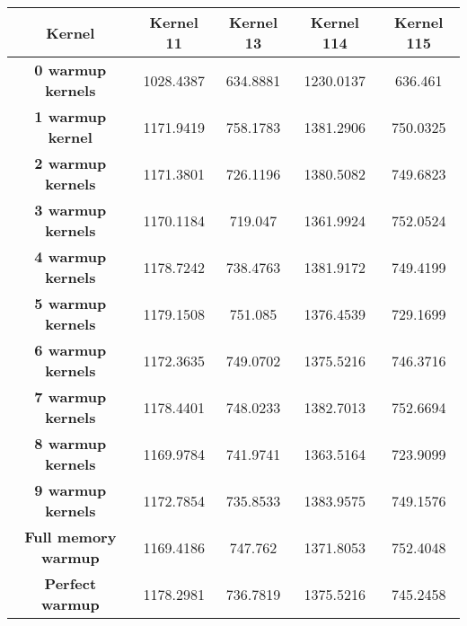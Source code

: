 \begin{tabular}{ |c|c|c|c|c |}
    \hline
    \textbf{Kernel} & Kernel 11 & Kernel 13 & Kernel 114 & Kernel 115 \\
    \hline
    \hline
    \textbf{0 warmup kernels} & 1028.4387 & 634.8881 & 1230.0137 & 636.461 \\
    \textbf{1 warmup kernel} & 1171.9419 & 758.1783 & 1381.2906 & 750.0325 \\
    \textbf{2 warmup kernels} & 1171.3801 & 726.1196 & 1380.5082 & 749.6823 \\
    \textbf{3 warmup kernels} & 1170.1184 & 719.047 & 1361.9924 & 752.0524 \\
    \textbf{4 warmup kernels} & 1178.7242 & 738.4763 & 1381.9172 & 749.4199 \\
    \textbf{5 warmup kernels} & 1179.1508 & 751.085 & 1376.4539 & 729.1699 \\
    \textbf{6 warmup kernels} & 1172.3635 & 749.0702 & 1375.5216 & 746.3716 \\
    \textbf{7 warmup kernels} & 1178.4401 & 748.0233 & 1382.7013 & 752.6694 \\
    \textbf{8 warmup kernels} & 1169.9784 & 741.9741 & 1363.5164 & 723.9099 \\
    \textbf{9 warmup kernels} & 1172.7854 & 735.8533 & 1383.9575 & 749.1576 \\
    \textbf{Full memory warmup} & 1169.4186 & 747.762 & 1371.8053 & 752.4048 \\
    \textbf{Perfect warmup} & 1178.2981 & 736.7819 & 1375.5216 & 745.2458 \\
    \hline
\end{tabular}